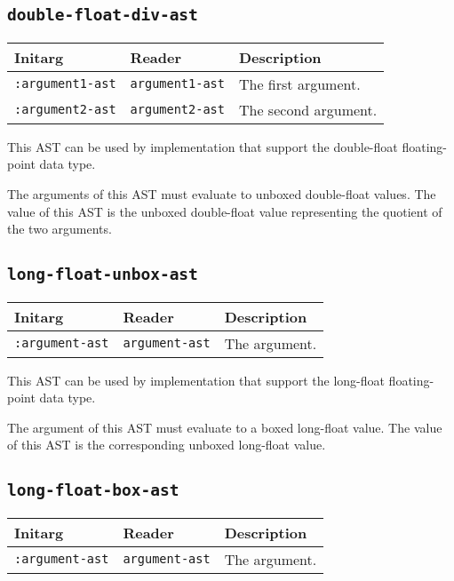 \subsection{\texttt{double-float-div-ast}}
\label{sec-ast-double-float-div}

\begin{tabular}{|l|l|l|}
\hline
Initarg & Reader & Description\\
\hline\hline
\texttt{:argument1-ast} & \texttt{argument1-ast} & The first argument.\\
\hline
\texttt{:argument2-ast} & \texttt{argument2-ast} & The second argument.\\
\hline
\end{tabular}

This AST can be used by implementation that support the double-float
floating-point data type.  

The arguments of this AST must evaluate to unboxed double-float
values.  The value of this AST is the unboxed double-float value
representing the quotient of the two arguments.

\subsection{\texttt{long-float-unbox-ast}}
\label{sec-ast-long-float-unbox}

\begin{tabular}{|l|l|l|}
\hline
Initarg & Reader & Description\\
\hline\hline
\texttt{:argument-ast} & \texttt{argument-ast} & The argument.\\
\hline
\end{tabular}

This AST can be used by implementation that support the long-float
floating-point data type.  

The argument of this AST must evaluate to a boxed long-float value.
The value of this AST is the corresponding unboxed long-float value.

\subsection{\texttt{long-float-box-ast}}
\label{sec-ast-long-float-box}

\begin{tabular}{|l|l|l|}
\hline
Initarg & Reader & Description\\
\hline\hline
\texttt{:argument-ast} & \texttt{argument-ast} & The argument.\\
\hline
\end{tabular}

